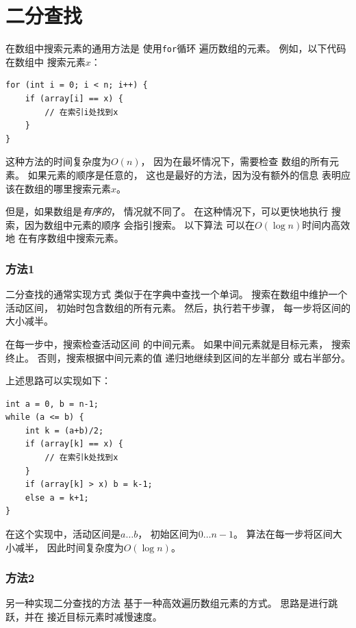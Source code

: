 \section{二分查找}


在数组中搜索元素的通用方法是
使用\texttt{for}循环
遍历数组的元素。
例如，以下代码在数组中
搜索元素$x$：

\begin{lstlisting}
for (int i = 0; i < n; i++) {
    if (array[i] == x) {
        // 在索引i处找到x
    }
}
\end{lstlisting}

这种方法的时间复杂度为$O(n)$，
因为在最坏情况下，需要检查
数组的所有元素。
如果元素的顺序是任意的，
这也是最好的方法，因为没有额外的信息
表明应该在数组的哪里搜索元素$x$。

但是，如果数组是\emph{有序的}，
情况就不同了。
在这种情况下，可以更快地执行
搜索，因为数组中元素的顺序
会指引搜索。
以下算法
可以在$O(\log n)$时间内高效地
在有序数组中搜索元素。

\subsubsection{方法1}

二分查找的通常实现方式
类似于在字典中查找一个单词。
搜索在数组中维护一个活动区间，
初始时包含数组的所有元素。
然后，执行若干步骤，
每一步将区间的大小减半。

在每一步中，搜索检查活动区间
的中间元素。
如果中间元素就是目标元素，
搜索终止。
否则，搜索根据中间元素的值
递归地继续到区间的左半部分
或右半部分。

上述思路可以实现如下：
\begin{lstlisting}
int a = 0, b = n-1;
while (a <= b) {
    int k = (a+b)/2;
    if (array[k] == x) {
        // 在索引k处找到x
    }
    if (array[k] > x) b = k-1;
    else a = k+1;
}
\end{lstlisting}

在这个实现中，活动区间是$a \ldots b$，
初始区间为$0 \ldots n-1$。
算法在每一步将区间大小减半，
因此时间复杂度为$O(\log n)$。

\subsubsection{方法2}

另一种实现二分查找的方法
基于一种高效遍历数组元素的方式。
思路是进行跳跃，并在
接近目标元素时减慢速度。

